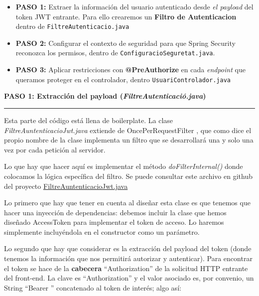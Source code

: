 \documentclass[a4paper,12pt]{report}
\begin{document}
		
		
		
		\begin{itemize} 
			\setlength{\itemsep}{-1.5em}
			\item \textbf{PASO 1:} Extraer la información del usuario autenticado desde \textit{el payload} del token JWT entrante. Para ello crearemos un \textbf{Filtro de Autenticacion} dentro de \texttt{FiltreAutenticacio.java}\\
			\item \textbf{PASO 2:} Configurar el contexto de seguridad para que Spring Security reconozca los permisos, dentro de  \texttt{ConfiguracioSeguretat.java}. \\ 	
			\item \textbf{PASO 3:} Aplicar restricciones con \textbf{@PreAuthorize} en cada \textit{endpoint} que queramos proteger en el controlador, dentro \texttt{UsuariControlador.java}
		\end{itemize}
		

		\noindent \textbf{PASO 1: Extracción del payload (\textit{FiltreAutenticació.java})}
		\hrule
		\vspace{1em}
		
		Esta parte del código está llena de boilerplate. La clase \textit{FiltreAuntenticacioJwt.java} extiende de OncePerRequestFilter \cite{oncePerRequestFilter}, que como dice el propio nombre de la clase implementa un filtro que se desarrollará una y solo una vez por cada petición al servidor.
		
		Lo que hay que hacer aquí es implementar el método \textit{doFilterInternal()} donde colocamos la lógica específica del filtro. Se puede consultar este archivo en github del proyecto \href{https://github.com/blackcub3s/mercApp/blob/main/APP%20WEB/__springboot__produccio__/app/src/main/java/miApp/app/seguretat/FiltreAutenticacioJwt.java}{FiltreAuntenticacioJwt.java}
		
		Lo primero que hay que tener en cuenta al diseñar esta clase es que tenemos que hacer una inyección de dependencias: debemos incluir la clase que hemos diseñado AccessToken para implementar el token de acceso. Lo haremos simplemente incluyéndola en el constructor como un parámetro.
		
		Lo segundo que hay que considerar es la extracción del payload del token (donde tenemos la información que nos permitirá autorizar y autenticar). Para encontrar el token se hace de la \textbf{cabecera} ``Authorization'' de la solicitud HTTP entrante del front-end. La clave es ``Authorization'' y el valor asociado es, por convenio, un String ``Bearer '' concatenado al token de interés; algo así:
		
\end{document}
